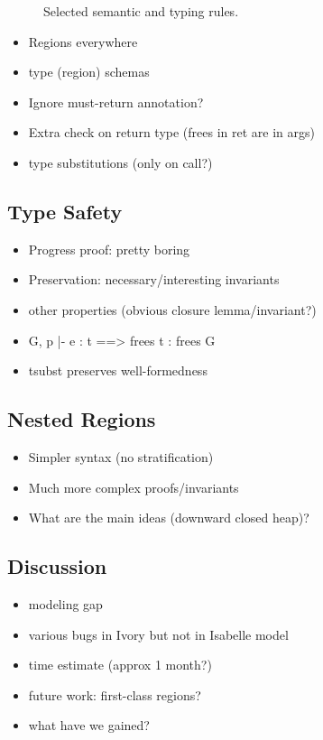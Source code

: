 \begin{figure*}[t]


\label{fig:rules}
\caption{Selected semantic and typing rules.}
\end{figure*}

\begin{itemize}
\item Regions everywhere
\item type (region) schemas
\item Ignore must-return annotation?
\item Extra check on return type (frees in ret are in args) 
\item type substitutions (only on call?)
\end{itemize}

\subsection{Type Safety}

\begin{itemize}
\item Progress proof: pretty boring
\item Preservation: necessary/interesting invariants
\item other properties (obvious closure lemma/invariant?)
\item G, p |- e : t ==> frees t : frees G
\item tsubst preserves well-formedness
\end{itemize}

\subsection{Nested Regions}

\begin{itemize}
\item Simpler syntax (no stratification)
\item Much more complex proofs/invariants
\item What are the main ideas (downward closed heap)?
\end{itemize}

\subsection{Discussion}

\begin{itemize}
\item modeling gap
\item various bugs in Ivory but not in Isabelle model
\item time estimate (approx 1 month?)
\item future work: first-class regions?
\item what have we gained?
\end{itemize}











